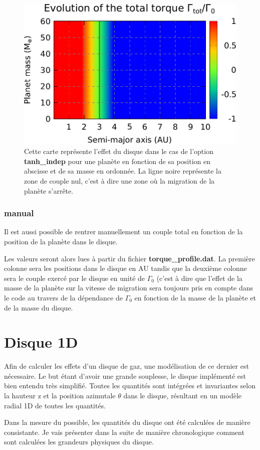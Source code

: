 \begin{figure}[htb]
\centering
\includegraphics[width=0.65\linewidth]{figure/migration_map/tanh_indep.pdf}
\caption{Cette carte représente l'effet du disque dans le cas de l'option \textbf{tanh\_indep} pour une planète en fonction de sa position en abscisse et de sa masse en ordonnée. La ligne noire représente la zone de couple nul, c'est à dire une zone où la migration de la planète s'arrête.}
\end{figure}

\subsubsection{manual}
Il est aussi possible de rentrer manuellement un couple total en fonction de la position de la planète dans le disque. 

Les valeurs seront alors lues à partir du fichier \textbf{torque\_profile.dat}. La première colonne sera les positions dans le disque en AU tandis que la deuxième colonne sera le couple exercé par le disque en unité de $\Gamma_0$ (c'est à dire que l'effet de la masse de la planète sur la vitesse de migration sera toujours pris en compte dans le code au travers de la dépendance de $\Gamma_0$ en fonction de la masse de la planète et de la masse du disque.


\section{Disque 1D}
Afin de calculer les effets d'un disque de gaz, une modélisation de ce dernier est nécessaire. Le but étant d'avoir une grande souplesse, le disque implémenté est bien entendu très simplifié. Toutes les quantités sont intégrées et invariantes selon la hauteur z et la position azimutale $\theta$ dans le disque, résultant en un modèle radial 1D de toutes les quantités. 

Dans la mesure du possible, les quantités du disque ont été calculées de manière consistante. Je vais présenter dans la suite de manière chronologique comment sont calculées les grandeurs physiques du disque.

